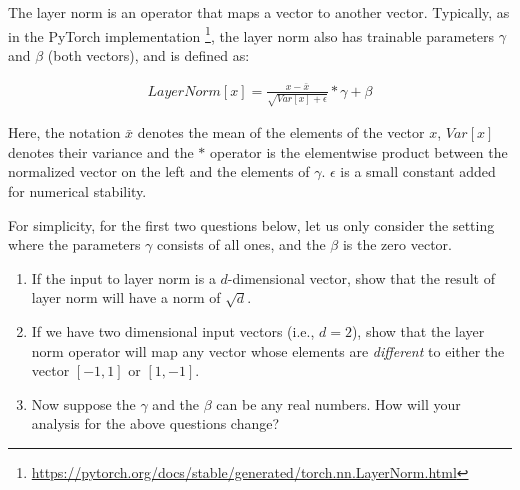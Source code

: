 The layer norm is an operator that maps a vector to another vector. Typically, as in the PyTorch implementation \footnote{\url{https://pytorch.org/docs/stable/generated/torch.nn.LayerNorm.html}}, the layer norm also has trainable parameters $\gamma$ and $\beta$ (both vectors), and is defined as:

\begin{align*}
LayerNorm[x] = \frac{x - \bar{x}}{\sqrt{Var[x] + \epsilon}} * \gamma + \beta
\end{align*}

Here, the notation $\bar{x}$ denotes the mean of the elements of the vector $x$,  $Var[x]$ denotes their variance and the $*$ operator is the elementwise product between the normalized vector on the left and the elements of $\gamma$. $\epsilon$ is a small constant added for numerical stability.

For simplicity, for the first two questions below, let us only consider the setting where the parameters $\gamma$ consists of all ones, and the $\beta$ is the zero vector.

\begin{enumerate}
\item\relax[5 points] If the input to layer norm is a $d$-dimensional vector, show that the result of layer norm will have a norm of $\sqrt{d}$.

\item\relax[10 points]  If we have two dimensional input vectors (i.e., $d=2$), show that the layer norm operator will map any vector whose elements are \emph{different} to either the vector $[-1, 1]$ or $[1, -1]$.

\item\relax[5 points] Now suppose the $\gamma$ and the $\beta$ can be any real numbers. How will your analysis for the above questions change? 
\end{enumerate}
